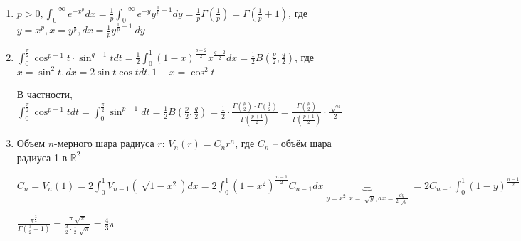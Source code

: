\begin{example}
    \begin{enumerate}
        \item $p > 0, \int_{0}^{+\infty}{e^{-x^p}}dx = \frac{1}{p}\int_{0}^{+\infty}{e^{-y}y^{\frac{1}{p} - 1}}dy = \frac{1}{p}\Gamma(\frac{1}{p}) = \Gamma(\frac{1}{p} + 1)$, где $y = x^p, x = y^{\frac{1}{p}}, dx = \frac{1}{p}y^{\frac{1}{p} - 1}\ dy$
        
        \item $\int_{0}^{\frac{\pi}{2}}{ \cos^{p-1}t \cdot \sin^{q - 1}t dt } = \frac{1}{2}\int_{0}^{1}(1 -x)^{\frac{p-2}{2}}x^{\frac{q-2}{2}}dx = \frac{1}{2}B(\frac{p}{2}, \frac{q}{2})$, где $x = \sin^2 t, dx = 2\sin t \cos t dt, 1 - x = \cos^2 t$
        
        В частности, $\int_{0}^{\frac{\pi}{2}}{ \cos^{p - 1}t dt } = \int_{0}^{\frac{\pi}{2}}\sin^{p-1}dt = \frac{1}{2}B(\frac{p}{2}, \frac{q}{2}) = \frac{1}{2} \cdot \frac{\Gamma(\frac{p}{2}) \cdot \Gamma(\frac{1}{2})}{\Gamma(\frac{p + 1}{2})} = \frac{\Gamma(\frac{p}{2})}{\Gamma(\frac{p + 1}{2})} \cdot \frac{\sqrt[]{\pi}}{2}$

        \item Объем $n$-мерного шара радиуса $r$: $V_n(r) = C_nr^n$, где $C_n$ -- объём шара радиуса 1 в $\mathbb{R}^2$

        $C_n = V_n(1) = 2 \int_{0}^{1}V_{n - 1}(\sqrt[]{1 - x^2})dx = 2 \int_{0}^{1}(1 - x^2)^{\frac{n-1}{2}}C_{n - 1}dx \underbrace{=}_{y = x^2, x = \sqrt[]{y}, dx = \frac{dy}{2\sqrt[]{y}}} = 2C_{n-1}\int_{0}^{1}(1 - y)^{\frac{n-1}{2}} \cdot \frac{1}{2} \cdot y^{-\frac{1}{2}}dy = C_{n-1} \cdot B(\frac{1}{2}, \frac{n + 1}{2}) = C_{n - 1}\frac{\Gamma(\frac{1}{2})\Gamma(\frac{n + 1}{2})}{\Gamma(\frac{n}{2} + 1)} = C_{n - 1}\sqrt[]{\pi}\frac{\Gamma(\frac{n + 1}{2})}{\Gamma(\frac{n}{2} + 1)} = C_{n - 2} \cdot (\sqrt[]{\pi})^2 \cdot \frac{\Gamma(\frac{n + 1}{2})}{\Gamma(\frac{n}{2} + 1)} \cdot \frac{\Gamma(\frac{n}{2})}{\Gamma(\frac{n + 1}{2})} = \dots = C_1 (\sqrt[]{\pi})^{n-1}\frac{\Gamma(\frac{3}{2})}{\Gamma(\frac{n}{2} + 1)} = 2 \cdot (\sqrt[]{\pi})^{n - 1} \cdot \frac{\frac{1}{2}\sqrt[]{\pi}}{\Gamma(\frac{n}{2} + 1)} = \frac{\pi^{\frac{n}{2}}}{\Gamma(\frac{n}{2} + 1)}$

        $\frac{\pi^{\frac{3}{2}}}{\Gamma(\frac{3}{2} + 1)} = \frac{\pi\sqrt[]{\pi}}{\frac{3}{2}\cdot\frac{1}{2}\sqrt[]{\pi}} = \frac{4}{3}\pi$
    \end{enumerate}
\end{example}

